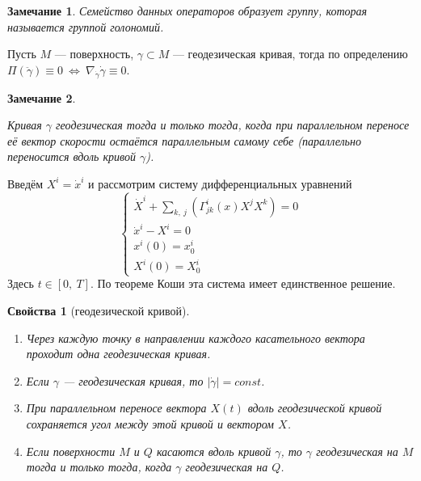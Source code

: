 \documentclass[12pt]{article}
\newcommand\tab[1][.5cm]{\hspace*{#1}}
\theoremstyle{plain}
\newtheorem{propertes}{Свойства}
\newtheorem{remark}{Замечание}
\begin{document}
    \begin{remark}
        Семейство данных операторов образует группу, которая называется группой голономий.
    \end{remark}
    Пусть $M$ --- поверхность, $\gamma\subset M$ --- геодезическая кривая, тогда по определению $\Pi(\ddot{\gamma})\equiv0 \ \Longleftrightarrow \ \nabla_{\dot{\gamma}}\dot{\gamma}\equiv0$.
    \begin{remark}\hypertarget{9}{}
        Кривая $\gamma$ геодезическая тогда и только тогда, когда при параллельном переносе её вектор скорости остаётся параллельным самому себе (параллельно переносится вдоль кривой $\gamma$).
    \end{remark}
    Введём $X^i=\dot{x}^i$ и рассмотрим систему дифференциальных уравнений $$\begin{cases}
        \dot{X}^i+\sum\limits_{k, \ j}(\Gamma^i_{jk}(x)X^jX^k)=0\\
        \dot{x}^i-X^i=0\\
        x^i(0)=x_0^i\\
        X^i(0)=X_0^i
    \end{cases}$$
    Здесь $t\in[0, \ T]$. По теореме Коши эта система имеет единственное решение.
    \begin{propertes}[геодезической кривой]\tab
        \begin{enumerate}
            \item Через каждую точку в направлении каждого касательного вектора проходит одна геодезическая кривая.
            \item Если $\gamma$ --- геодезическая кривая, то $|\dot{\gamma}|=const$.
            \item При параллельном переносе вектора $X(t)$ вдоль геодезической кривой сохраняется угол между этой кривой и вектором $X$.
            \item Если поверхности $M$ и $Q$ касаются вдоль кривой $\gamma$, то $\gamma$ геодезическая на $M$ тогда и только тогда, когда $\gamma$ геодезическая на $Q$.
        \end{enumerate}
    \end{propertes}
\end{document}

